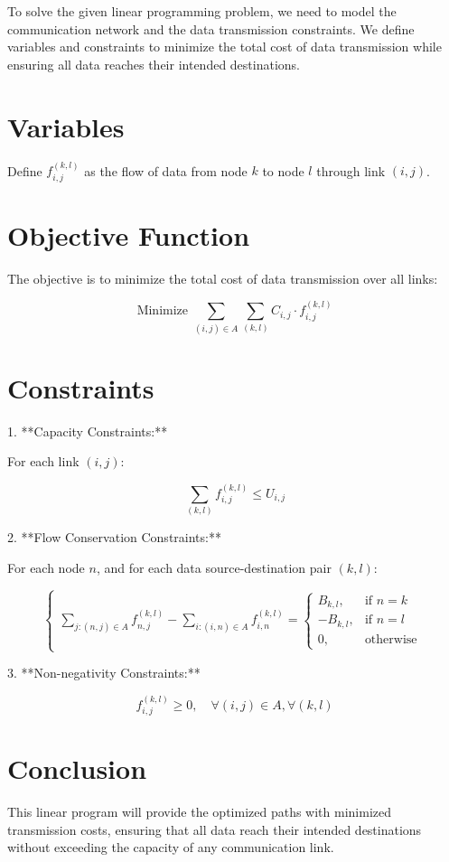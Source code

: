 \documentclass{article}
\begin{document}
To solve the given linear programming problem, we need to model the communication network and the data transmission constraints. We define variables and constraints to minimize the total cost of data transmission while ensuring all data reaches their intended destinations.

\section*{Variables}

Define \( f_{i,j}^{(k,l)} \) as the flow of data from node \( k \) to node \( l \) through link \( (i, j) \).

\section*{Objective Function}

The objective is to minimize the total cost of data transmission over all links:

\[
\text{Minimize } \sum_{(i,j) \in A} \sum_{(k,l)} C_{i,j} \cdot f_{i,j}^{(k,l)}
\]

\section*{Constraints}

1. **Capacity Constraints:**

   For each link \( (i, j) \):

   \[
   \sum_{(k,l)} f_{i,j}^{(k,l)} \leq U_{i,j}
   \]

2. **Flow Conservation Constraints:**

   For each node \( n \), and for each data source-destination pair \( (k, l) \):

   \[
   \begin{cases} 
   \sum_{j: (n,j) \in A} f_{n,j}^{(k,l)} - \sum_{i: (i,n) \in A} f_{i,n}^{(k,l)} = \begin{cases} 
   B_{k,l}, & \text{if } n = k \\
   -B_{k,l}, & \text{if } n = l \\
   0, & \text{otherwise}
   \end{cases}
   \end{cases}
   \]

3. **Non-negativity Constraints:**

   \[
   f_{i,j}^{(k,l)} \geq 0, \quad \forall (i,j) \in A, \forall (k,l)
   \]

\section*{Conclusion}

This linear program will provide the optimized paths with minimized transmission costs, ensuring that all data reach their intended destinations without exceeding the capacity of any communication link.
\end{document}
